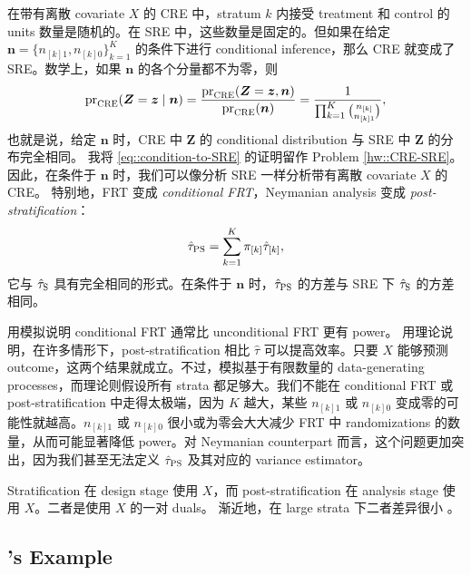 在带有离散 covariate $X$ 的 CRE 中，stratum $k$ 内接受 treatment 和 control 的 units 数量是随机的。在 SRE 中，这些数量是固定的。但如果在给定 $\boldsymbol{n} = \{  n_{[k]1} , n_{[k]0} \}_{k=1}^K$ 的条件下进行 conditional inference，那么 CRE 就变成了 SRE。数学上，如果 $\boldsymbol{n}$ 的各个分量都不为零，则
\begin{equation}\label{eq::condition-to-SRE}
\textup{pr}_\textsc{CRE}(\boldsymbol{Z} = \boldsymbol{z} \mid\boldsymbol{n} )
= \frac{ \textup{pr}_\textsc{CRE}( \boldsymbol{Z} = \boldsymbol{z},  \boldsymbol{n})   }{ \textup{pr}_\textsc{CRE}(   \boldsymbol{n})   }
=  \frac{1}{  \prod_{k=1}^K  \binom{  n_{[k]} }{  n_{[k]1} } }  ,
\end{equation}
也就是说，给定 $\boldsymbol{n}$ 时，CRE 中 $\boldsymbol{Z}$ 的 conditional distribution 与 SRE 中 $\boldsymbol{Z}$ 的分布完全相同。
我将 \eqref{eq::condition-to-SRE} 的证明留作 Problem \ref{hw::CRE-SRE}。
因此，在条件于 $\boldsymbol{n}$ 时，我们可以像分析 SRE 一样分析带有离散 covariate $X$ 的 CRE。
特别地，FRT 变成 {\it conditional FRT}，Neymanian analysis 变成 {\it post-stratification}：
$$
\hat{\tau}_\textsc{PS} = \sum_{k=1}^K \pi_{[k]} \hat{\tau}_{[k]},
$$
它与 $\hat{\tau}_\textsc{S}$ 具有完全相同的形式。在条件于 $\boldsymbol{n}$ 时，$\hat{\tau}_\textsc{PS} $ 的方差与 SRE 下 $\hat{\tau}_\textsc{S}$ 的方差相同。


\citet{hennessy2016conditional} 用模拟说明 conditional FRT 通常比 unconditional FRT 更有 power。\citet{miratrix:2013} 用理论说明，在许多情形下，post-stratification 相比 $\hat{\tau}$ 可以提高效率。只要 $X$ 能够预测 outcome，这两个结果就成立。不过，模拟基于有限数量的 data-generating processes，而理论则假设所有 strata 都足够大。我们不能在 conditional FRT 或 post-stratification 中走得太极端，因为 $K$ 越大，某些 $n_{[k]1} $ 或 $ n_{[k]0}$ 变成零的可能性就越高。$n_{[k]1} $ 或 $ n_{[k]0}$ 很小或为零会大大减少 FRT 中 randomizations 的数量，从而可能显著降低 power。对 Neymanian counterpart 而言，这个问题更加突出，因为我们甚至无法定义 $\hat{\tau}_\textsc{PS}$ 及其对应的 variance estimator。


Stratification 在 design stage 使用 $X$，而 post-stratification 在 analysis stage 使用 $X$。二者是使用 $X$ 的一对 duals。
渐近地，在 large strata 下二者差异很小 \citep{miratrix:2013}。

\subsection{\citet{meinert1970study}'s Example}\label{sec::ps-merinert}

